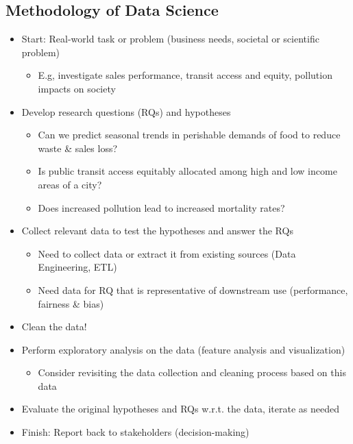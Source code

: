 \documentclass[11pt]{article}
\theoremstyle{definition}
\begin{document}
\subsection{Methodology of Data Science}
\begin{itemize}
  \item Start: Real-world task or problem (business needs, societal or scientific problem)
  \begin{itemize}
    \item E.g, investigate sales performance, transit access and equity, pollution impacts on society
  \end{itemize}
  \item Develop research questions (RQs) and hypotheses
  \begin{itemize}
    \item Can we predict seasonal trends in perishable demands of food to reduce waste \& sales loss?
    \item Is public transit access equitably allocated among high and low income areas of a city?
    \item Does increased pollution lead to increased mortality rates?
  \end{itemize}
  \item Collect relevant data to test the hypotheses and answer the RQs
  \begin{itemize}
    \item Need to collect data or extract it from existing sources (Data Engineering, ETL)
    \item Need data for RQ that is representative of downstream use (performance, fairness \& bias)
  \end{itemize}
  \item Clean the data!
  \item Perform exploratory analysis on the data (feature analysis and visualization)
  \begin{itemize}
    \item Consider revisiting the data collection and cleaning process based on this data
  \end{itemize}
  \item Evaluate the original hypotheses and RQs w.r.t. the data, iterate as needed
  \item Finish: Report back to stakeholders (decision-making)
\end{itemize}
\end{document}
